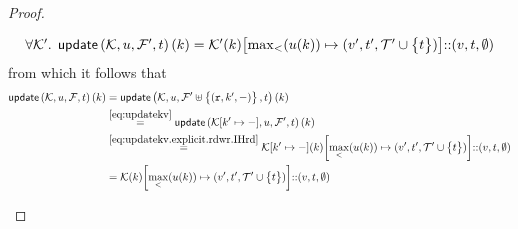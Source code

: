 \begin{proof}
\begin{enumerate}
\begin{itemize}
			\begin{equation}
			\label{eq:updatekv.explicit.rdwr.IHrd}
            \begin{array}{l}
            \fora{\mkvs'}\updateKV[\mkvs,\vi,\fp',\txid](\key) = 
            \mkvs'(\key)\rmto{\max_{<}(\vi(\key))}{(\val', \txid', \txidset' \cup \Set{\txid})} \lcat (\val, \txid, \emptyset)
            \end{array}
			\end{equation}
			from which it follows that 
            \begin{align*}
			    \updateKV[\mkvs, \vi, \fp,\txid](\key)
                & = 
                \updateKV[\mkvs, \vi, \fp' \uplus \Set{(\otR, \key', \stub)}, \txid](\key) \\
                & \stackrel{\cref{eq:updatekv}}{=}
			    \updateKV[\mkvs\rmto{\key'}{\stub}, \vi, \fp', \txid](\key) \\
                & \stackrel{\cref{eq:updatekv.explicit.rdwr.IHrd}}{=} 
                \mkvs\rmto{\key'}{\stub}(\key)\rmto{\max_{<}(\vi(\key))}{(\val', \txid', \txidset' \cup \Set{\txid})} \lcat (\val, \txid, \emptyset) \\
                & = 
                \mkvs(\key)\rmto{\max_{<}(\vi(\key))}{(\val', \txid', \txidset' \cup \Set{\txid})} \lcat (\val, \txid, \emptyset)
            \end{align*}
			

\end{itemize}
\end{enumerate}
\end{proof}

